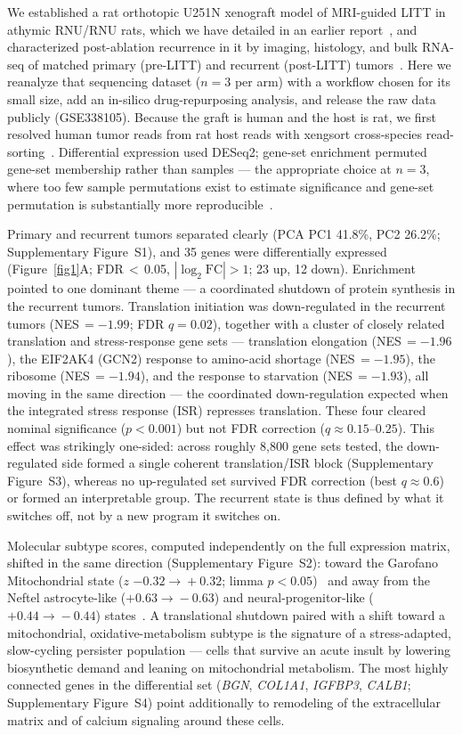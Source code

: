 \documentclass[unnumsec,webpdf,contemporary,large]{oup-authoring-template}
\begin{document}
We established a rat orthotopic U251N xenograft model of MRI-guided LITT in athymic RNU/RNU rats, which we have detailed in an earlier report~\cite{NagarajaLITT}, and characterized post-ablation recurrence in it by imaging, histology, and bulk RNA-seq of matched primary (pre-LITT) and recurrent (post-LITT) tumors~\cite{NagarajaJNS}. Here we reanalyze that sequencing dataset ($n=3$ per arm) with a workflow chosen for its small size, add an in-silico drug-repurposing analysis, and release the raw data publicly (GSE338105). Because the graft is human and the host is rat, we first resolved human tumor reads from rat host reads with xengsort cross-species read-sorting~\cite{xengsort}. Differential expression used DESeq2; gene-set enrichment permuted gene-set membership rather than samples --- the appropriate choice at $n=3$, where too few sample permutations exist to estimate significance and gene-set permutation is substantially more reproducible~\cite{Maleki}.

Primary and recurrent tumors separated clearly (PCA PC1 41.8\%, PC2 26.2\%; Supplementary Figure~S1), and 35 genes were differentially expressed (Figure~\ref{fig1}A; FDR\,$<$\,0.05, $|\log_{2}\mathrm{FC}|>1$; 23 up, 12 down). Enrichment pointed to one dominant theme --- a coordinated shutdown of protein synthesis in the recurrent tumors. Translation initiation was down-regulated in the recurrent tumors (NES\,$=-1.99$; FDR $q=0.02$), together with a cluster of closely related translation and stress-response gene sets --- translation elongation (NES\,$=-1.96$), the EIF2AK4 (GCN2) response to amino-acid shortage (NES\,$=-1.95$), the ribosome (NES\,$=-1.94$), and the response to starvation (NES\,$=-1.93$), all moving in the same direction --- the coordinated down-regulation expected when the integrated stress response (ISR) represses translation. These four cleared nominal significance ($p<0.001$) but not FDR correction ($q\approx0.15$--$0.25$). This effect was strikingly one-sided: across roughly 8{,}800 gene sets tested, the down-regulated side formed a single coherent translation/ISR block (Supplementary Figure~S3), whereas no up-regulated set survived FDR correction (best $q\approx0.6$) or formed an interpretable group. The recurrent state is thus defined by what it switches off, not by a new program it switches on.

Molecular subtype scores, computed independently on the full expression matrix, shifted in the same direction (Supplementary Figure~S2): toward the Garofano Mitochondrial state ($z$ $-0.32\!\rightarrow\!+0.32$; limma $p<0.05$)~\cite{Garofano} and away from the Neftel astrocyte-like ($+0.63\!\rightarrow\!-0.63$) and neural-progenitor-like ($+0.44\!\rightarrow\!-0.44$) states~\cite{Neftel}. A translational shutdown paired with a shift toward a mitochondrial, oxidative-metabolism subtype is the signature of a stress-adapted, slow-cycling persister population --- cells that survive an acute insult by lowering biosynthetic demand and leaning on mitochondrial metabolism. The most highly connected genes in the differential set (\textit{BGN}, \textit{COL1A1}, \textit{IGFBP3}, \textit{CALB1}; Supplementary Figure~S4) point additionally to remodeling of the extracellular matrix and of calcium signaling around these cells.
\end{document}

